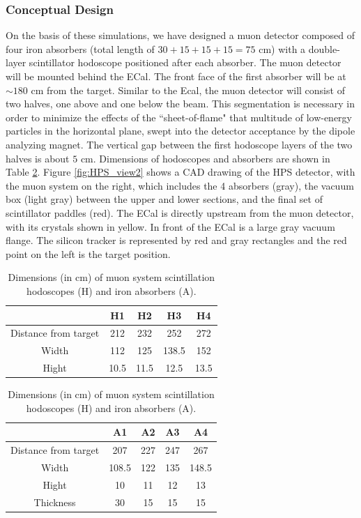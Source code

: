 \subsubsection{Conceptual Design}

On the basis of these simulations, we have designed a muon detector composed of four iron absorbers (total length of $30+15+15+15=75$ cm) with a double-layer scintillator hodoscope positioned after each absorber. The muon detector will be mounted behind the ECal.  The front face of the first absorber will be at $\sim 180$ cm from the target. Similar to the Ecal, the muon detector will consist of two halves, one above and one below the beam.  This segmentation is necessary in order to
minimize the effects of the ``sheet-of-flame" that multitude of low-energy particles in the horizontal plane, swept into the detector acceptance by the dipole analyzing magnet.
The vertical gap between the first hodoscope layers of the two halves is about $5$ cm. Dimensions of hodoscopes and absorbers are shown in Table \ref{tb:muon}.  Figure \ref{fig:HPS_view2} shows a CAD
drawing of the HPS detector, with the muon system on the right, which includes the 4 absorbers (gray), the vacuum box (light gray) between the upper and lower sections, and the final set of scintillator paddles (red). The ECal is directly upstream from the muon detector, with its crystals shown in yellow.  In front of the ECal is a large gray vacuum flange.  The silicon tracker is represented by red and gray rectangles and  the red point on the left is the target position.  

\begin{table}[htdp]
\caption{Dimensions (in cm) of muon system scintillation hodoscopes (H) and iron absorbers (A). }
\begin{center}
\begin{tabular}{|c|c|c|c|c|}
\hline
&H1&H2&H3&H4\\
\hline
Distance from target& 212&232&252&272\\
Width&112&125&138.5&152\\
Hight&10.5&11.5&12.5&13.5\\
\hline
\end{tabular}

\begin{tabular}{|c|c|c|c|c|}
\hline
&A1&A2&A3&A4\\
\hline
Distance from target& 207&227&247&267\\
Width&108.5&122&135&148.5\\
Hight&10&11&12&13\\
Thickness & 30 & 15& 15 & 15\\
\hline
\end{tabular}
\end{center}
\label{tb:muon}
\end{table}%


